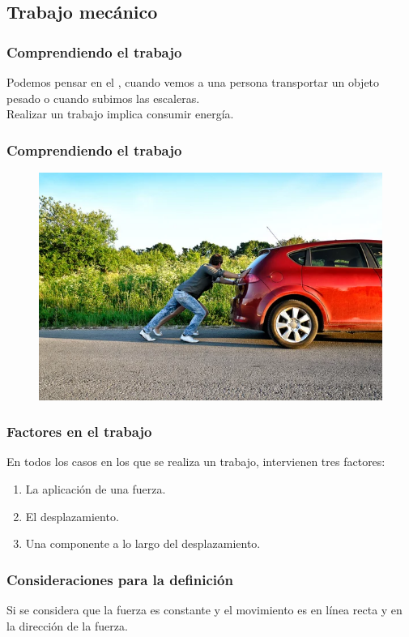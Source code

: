 \documentclass[14pt]{beamer}
\begin{document}
\subsection{Trabajo mecánico}

\begin{frame}
\frametitle{Comprendiendo el trabajo}
Podemos pensar en el , cuando vemos a una persona transportar un objeto pesado o cuando subimos las escaleras.
\\
\bigskip
\pause
Realizar un trabajo implica consumir energía.
\end{frame}
\begin{frame}
\frametitle{Comprendiendo el trabajo}
\begin{figure}
    \centering
    \includegraphics[scale=0.4]{Imagenes/Energia_03.png}
\end{figure}
\end{frame}
\begin{frame}
\frametitle{Factores en el trabajo}
En todos los casos en los que se realiza un trabajo, intervienen tres factores:
\pause
{}
\begin{enumerate}[<+->]
\item La aplicación de una fuerza.
\item El desplazamiento.
\item Una componente a lo largo del desplazamiento.
\end{enumerate}
\end{frame}
\begin{frame}
\frametitle{Consideraciones para la definición}
Si se considera que la fuerza es constante y el movimiento es en línea recta y en la dirección de la fuerza.
\end{frame}
\end{document}
